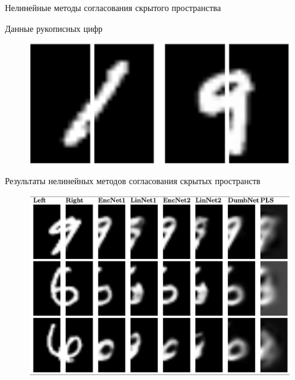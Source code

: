 \documentclass[9pt]{beamer}
\begin{document}
\begin{frame}{Нелинейные методы согласования скрытого пространства}
\begin{minipage}{.35\linewidth}
\begin{block}{Данные рукописных цифр}
\begin{figure}
			\includegraphics[width=1.0\linewidth]{figs/left_right_mnist}
		\end{figure}
	\end{block}
	
	\end{minipage}

\end{frame}
\begin{frame}{Результаты нелинейных методов согласования скрытых пространств}
	\begin{figure}
		\includegraphics[width=\linewidth]{figs/mnist_preds}
	\end{figure}

\end{frame}
\end{document}
